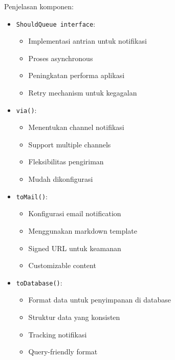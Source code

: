 \documentclass[a4paper]{report}
\begin{document}
Penjelasan komponen:
\begin{itemize}
\item \texttt{ShouldQueue interface}:
    \begin{itemize}
    \item Implementasi antrian untuk notifikasi
    \item Proses asynchronous
    \item Peningkatan performa aplikasi
    \item Retry mechanism untuk kegagalan
    \end{itemize}

\item \texttt{via()}:
    \begin{itemize}
    \item Menentukan channel notifikasi
    \item Support multiple channels
    \item Fleksibilitas pengiriman
    \item Mudah dikonfigurasi
    \end{itemize}

\item \texttt{toMail()}:
    \begin{itemize}
    \item Konfigurasi email notification
    \item Menggunakan markdown template
    \item Signed URL untuk keamanan
    \item Customizable content
    \end{itemize}

\item \texttt{toDatabase()}:
    \begin{itemize}
    \item Format data untuk penyimpanan di database
    \item Struktur data yang konsisten
    \item Tracking notifikasi
    \item Query-friendly format
    \end{itemize}
\end{itemize}
\end{document}
